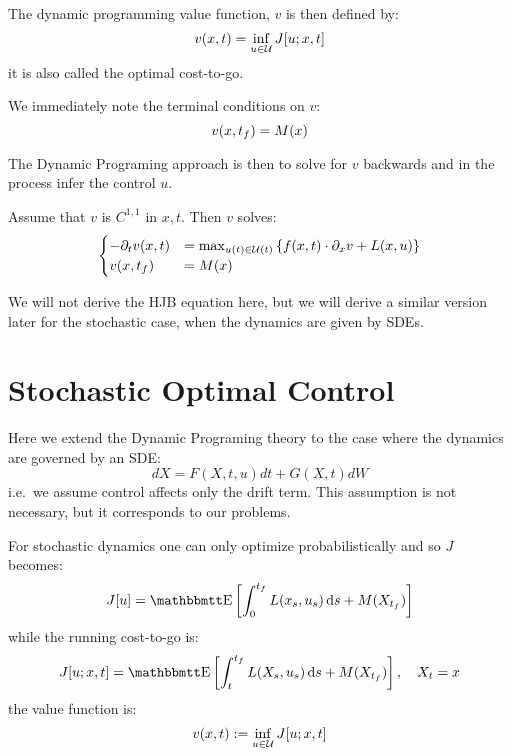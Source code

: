 The dynamic programming value function, $v$ is then defined by:
$$
v(x,t) = \inf_{u \in { \mathcal{U} }} J[u; x,t] 
$$
it is also called the optimal cost-to-go. 

We immediately note the terminal conditions on $v$:
\begin{equation}
v(x,{ t_f } ) = M(x)
\end{equation}


The Dynamic Programing approach is then to solve for $v$ backwards and in the
process infer the control $u$.
\begin{thm} Assume that $v$ is $C^{1,1}$ in
$x,t$. Then $v$ solves:
\begin{equation}
\begin{cases}
-{\partial}_t v(x,t) &= \max_{u(t) \in { \mathcal{U} }(t)} \left\{ f(x,t) \cdot {\partial}_x v +
L(x,u) \right\}
\\
v(x,{ t_f }) &= M(x)
\end{cases}
\end{equation}
\end{thm}
We will not derive the HJB equation here, but we will derive a similar version
later for the stochastic case, when the dynamics are given by SDEs. 


\section{Stochastic Optimal Control}
\label{sec:stochastic_control}
Here we extend the Dynamic Programing theory to the case where the dynamics are
governed by an SDE:
\begin{equation}
dX = F(X,t, u) dt + G(X,t) dW
\end{equation} 
i.e.\ we assume control affects only the drift term. This 
assumption is not necessary, but it corresponds to our problems.

For stochastic dynamics one can only optimize probabilistically and so
$J$ becomes:
\begin{equation}
J[u] = \Exp \left[ \int_0^\tf L(x_s, u_s) \intd{s} + M(X_\tf)
\right] 
\label{eq:generic_objective_function_stochastic}
\end{equation}
while the running cost-to-go is:
\begin{equation}
J[u; x, t] = \Exp \left[ \int_t^\tf L(X_s, u_s) \intd{s} + M(X_\tf) \right], 
\quad X_t = x
\label{eq:generic_cost_to_go_stochastic}
\end{equation}
the value function is:
\begin{equation}
v(x,t) := \inf_{u \in { \mathcal{U} }} J[u; x,t]
\end{equation}

